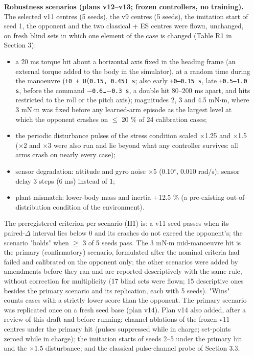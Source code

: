 \documentclass[10pt,a4paper]{article}
\begin{document}
\textbf{Robustness scenarios (plans v12--v13; frozen controllers, no training).} The selected v11 centres (5 seeds), the v9 centres (5 seeds), the imitation start of seed 1, the opponent and the two classical + ES centres were flown, unchanged, on fresh blind sets in which one element of the case is changed (Table R1 in Section 3):

\begin{itemize}\setlength\itemsep{2pt}
\item a 20 ms torque hit about a horizontal axis fixed in the heading frame (an external torque added to the body in the simulator), at a random time during the manoeuvre (\texttt{t0 + U(0.15, 0.45) s}; also early \texttt{+0--0.15 s}, late \texttt{+0.5--1.0 s}, before the command \texttt{$-$0.6\ldots{}$-$0.3 s}, a double hit 80--200 ms apart, and hits restricted to the roll or the pitch axis); magnitudes 2, 3 and 4.5 mN$\cdot$m, where 3 mN$\cdot$m was fixed before any learned-arm episode as the largest level at which the opponent crashes on $\le$ 20 \% of 24 calibration cases;
\item the periodic disturbance pulses of the stress condition scaled $\times$1.25 and $\times$1.5 ($\times$2 and $\times$3 were also run and lie beyond what any controller survives: all arms crash on nearly every case);
\item sensor degradation: attitude and gyro noise $\times$5 (0.10$^\circ$, 0.010 rad/s); sensor delay 3 steps (6 ms) instead of 1;
\item plant mismatch: lower-body mass and inertia +12.5 \% (a pre-existing out-of-distribution condition of the environment).
\end{itemize}

The preregistered criterion per scenario (H1) is: a v11 seed passes when its paired-$\Delta$ interval lies below 0 and its crashes do not exceed the opponent's; the scenario "holds" when $\ge$ 3 of 5 seeds pass. The 3 mN$\cdot$m mid-manoeuvre hit is the primary (confirmatory) scenario, formulated after the nominal criteria had failed and calibrated on the opponent only; the other scenarios were added by amendments before they ran and are reported descriptively with the same rule, without correction for multiplicity (17 blind sets were flown; 15 descriptive ones besides the primary scenario and its replication, each with 5 seeds). "Wins" counts cases with a strictly lower score than the opponent. The primary scenario was replicated once on a fresh seed base (plan v14). Plan v14 also added, after a review of this draft and before running: channel ablations of the frozen v11 centres under the primary hit (pulses suppressed while in charge; set-points zeroed while in charge); the imitation starts of seeds 2--5 under the primary hit and the $\times$1.5 disturbance; and the classical pulse-channel probe of Section 3.3.
\end{document}
